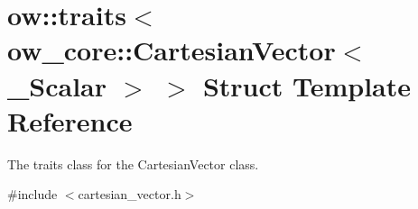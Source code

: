 \hypertarget{structow_1_1traits_3_01ow__core_1_1CartesianVector_3_01__Scalar_01_4_01_4}{}\section{ow\+:\+:traits$<$ ow\+\_\+core\+:\+:Cartesian\+Vector$<$ \+\_\+\+Scalar $>$ $>$ Struct Template Reference}
\label{structow_1_1traits_3_01ow__core_1_1CartesianVector_3_01__Scalar_01_4_01_4}


The traits class for the Cartesian\+Vector class.  




{\ttfamily \#include $<$cartesian\+\_\+vector.\+h$>$}

